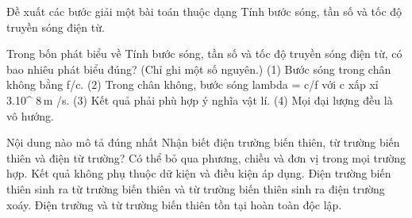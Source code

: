 \begin{bt}
Đề xuất các bước giải một bài toán thuộc dạng Tính bước sóng, tần số và tốc độ truyền sóng điện từ.
\end{bt}

\begin{ex}
Trong bốn phát biểu về Tính bước sóng, tần số và tốc độ truyền sóng điện từ, có bao nhiêu phát biểu đúng? (Chỉ ghi một số nguyên.) (1) Bước sóng trong chân không bằng f/c. (2) Trong chân không, bước sóng lambda = c/f với c xấp xỉ 3.10^ $8\,\text{m}$ /s. (3) Kết quả phải phù hợp ý nghĩa vật lí. (4) Mọi đại lượng đều là vô hướng.
\end{ex}

\begin{ex}
Nội dung nào mô tả đúng nhất Nhận biết điện trường biến thiên, từ trường biến thiên và điện từ trường?
\choice
{Có thể bỏ qua phương, chiều và đơn vị trong mọi trường hợp.}
{Kết quả không phụ thuộc dữ kiện và điều kiện áp dụng.}
{\True Điện trường biến thiên sinh ra từ trường biến thiên và từ trường biến thiên sinh ra điện trường xoáy.}
{Điện trường và từ trường biến thiên tồn tại hoàn toàn độc lập.}
\end{ex}

